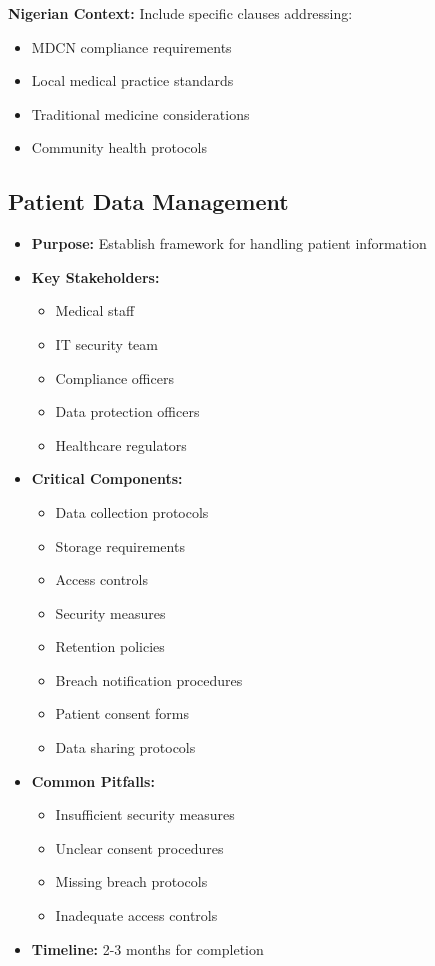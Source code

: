 \begin{tcolorbox}[colback=white,colframe=primarydark,title=\textbf{Healthcare Integration Documentation}]
\textbf{Nigerian Context:}
Include specific clauses addressing:
\begin{itemize}
    \item MDCN compliance requirements
    \item Local medical practice standards
    \item Traditional medicine considerations
    \item Community health protocols
\end{itemize}
\end{tcolorbox}

\subsection{Patient Data Management}
\begin{tcolorbox}[colback=white,colframe=primarydark,title=\textbf{Patient Data Documentation}]
\begin{itemize}
    \item \textbf{Purpose:} Establish framework for handling patient information
    \item \textbf{Key Stakeholders:}
    \begin{itemize}
        \item Medical staff
        \item IT security team
        \item Compliance officers
        \item Data protection officers
        \item Healthcare regulators
    \end{itemize}
    \item \textbf{Critical Components:}
    \begin{itemize}
        \item Data collection protocols
        \item Storage requirements
        \item Access controls
        \item Security measures
        \item Retention policies
        \item Breach notification procedures
        \item Patient consent forms
        \item Data sharing protocols
    \end{itemize}
    \item \textbf{Common Pitfalls:}
    \begin{itemize}
        \item Insufficient security measures
        \item Unclear consent procedures
        \item Missing breach protocols
        \item Inadequate access controls
    \end{itemize}
    \item \textbf{Timeline:} 2-3 months for completion
\end{itemize}


\end{tcolorbox}
